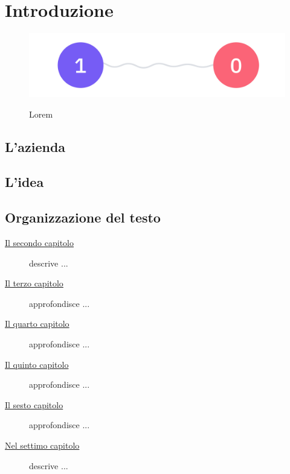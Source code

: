 \chapter{Introduzione}
\label{chap:introduzione}

\begin{figure}[H]
    \centering
    \includegraphics[alt={Testo alternativo dell'immagine}, width=1\columnwidth]{img/quantum_entanglement.jpeg}
    \caption{Lorem}
    \label{fig:entanglement}
\end{figure}






\section{L'azienda}



\section{L'idea}


\section{Organizzazione del testo}
\begin{description}
    \item[{\hyperref[chap:processi-metodologie]{Il secondo capitolo}}] descrive ...
    
    \item[{\hyperref[chap:descrizione-stage]{Il terzo capitolo}}] approfondisce ...
    
    \item[{\hyperref[chap:analisi-requisiti]{Il quarto capitolo}}] approfondisce ...
    
    \item[{\hyperref[chap:progettazione-codifica]{Il quinto capitolo}}] approfondisce ...
    
    \item[{\hyperref[chap:verifica-validazione]{Il sesto capitolo}}] approfondisce ...
    
    \item[{\hyperref[chap:conclusioni]{Nel settimo capitolo}}] descrive ...
\end{description}


